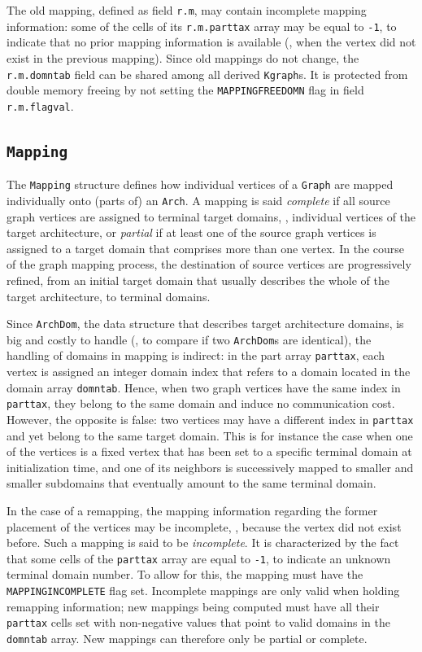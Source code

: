 The old mapping, defined as field \texttt{r.m},
may contain incomplete mapping information: some of the cells of its
\texttt{r.m.parttax} array may be equal to \texttt{-1}, to indicate
that no prior mapping information is available (\eg, when the vertex
did not exist in the previous mapping). Since old mappings do not
change, the \texttt{r.m.domntab} field can be shared among all derived
\texttt{Kgraph}s. It is protected from double memory freeing by not
setting the \texttt{MAPPING\lbt FREE\lbt DOMN} flag in field
\texttt{r.m.flagval}.

\subsection{\texttt{Mapping}}
\label{sec-data-mapping}

The \texttt{Mapping} structure defines how individual vertices of a
\texttt{Graph} are mapped individually onto (parts of) an
\texttt{Arch}. A mapping is said \textit{complete} if all source graph
vertices are assigned to terminal target domains, \ie, individual
vertices of the target architecture, or \textit{partial} if at least
one of the source graph vertices is assigned to a target domain that
comprises more than one vertex. In the course of the graph mapping
process, the destination of source vertices are progressively refined,
from an initial target domain that usually describes the whole of the
target architecture, to terminal domains.

Since \texttt{ArchDom}, the data structure that describes target
architecture domains, is big and costly to handle (\eg, to compare if
two \texttt{ArchDom}s are identical), the handling of domains in
mapping is indirect: in the part array \texttt{parttax}, each vertex
is assigned an integer domain index that refers to a domain located in
the domain array \texttt{domntab}. Hence, when two graph vertices have
the same index in \texttt{parttax}, they belong to the same domain and
induce no communication cost. However, the opposite is false: two
vertices may have a different index in \texttt{parttax} and yet belong
to the same target domain. This is for instance the case when one of
the vertices is a fixed vertex that has been set to a specific
terminal domain at initialization time, and one of its neighbors is
successively mapped to smaller and smaller subdomains that eventually
amount to the same terminal domain.

In the case of a remapping, the mapping information regarding the
former placement of the vertices may be incomplete, \eg, because the
vertex did not exist before. Such a mapping is said to be
\textit{incomplete}. It is characterized by the fact that some cells
of the \texttt{parttax} array are equal to \texttt{-1}, to indicate an
unknown terminal domain number. To allow for this, the mapping must
have the \texttt{MAPPING\lbt INCOMPLETE} flag set. Incomplete mappings
are only valid when holding remapping information; new mappings being
computed must have all their \texttt{parttax} cells set with
non-negative values that point to valid domains in the
\texttt{domntab} array. New mappings can therefore only be partial or
complete.

